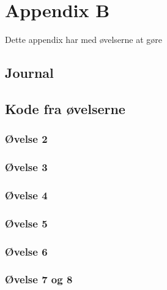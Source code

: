 \section{Appendix B}
Dette appendix har med øvelserne at gøre
\subsection{Journal}

\subsection{Kode fra øvelserne}
\subsubsection{Øvelse 2}

\newpage
\subsubsection{Øvelse 3}

\newpage
\subsubsection{Øvelse 4}

\newpage
\subsubsection{Øvelse 5}

\newpage
\subsubsection{Øvelse 6}

\newpage
\subsubsection{Øvelse 7 og 8}

\newpage